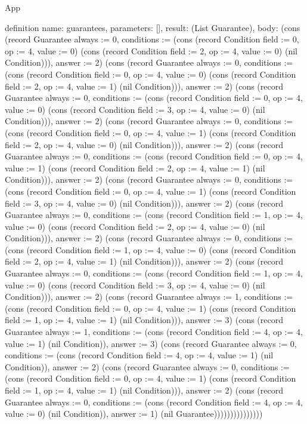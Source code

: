 \begin{lexlean}{App}
\begin{semanticmodule}
definition{
  name: guarantees,
  parameters: [],
  result: (List Guarantee),
  body: (cons (record Guarantee {always := 0, conditions := (cons (record Condition {field := 0, op := 4, value := 0}) (cons (record Condition {field := 2, op := 4, value := 0}) (nil Condition))), answer := 2}) (cons (record Guarantee {always := 0, conditions := (cons (record Condition {field := 0, op := 4, value := 0}) (cons (record Condition {field := 2, op := 4, value := 1}) (nil Condition))), answer := 2}) (cons (record Guarantee {always := 0, conditions := (cons (record Condition {field := 0, op := 4, value := 0}) (cons (record Condition {field := 3, op := 4, value := 0}) (nil Condition))), answer := 2}) (cons (record Guarantee {always := 0, conditions := (cons (record Condition {field := 0, op := 4, value := 1}) (cons (record Condition {field := 2, op := 4, value := 0}) (nil Condition))), answer := 2}) (cons (record Guarantee {always := 0, conditions := (cons (record Condition {field := 0, op := 4, value := 1}) (cons (record Condition {field := 2, op := 4, value := 1}) (nil Condition))), answer := 2}) (cons (record Guarantee {always := 0, conditions := (cons (record Condition {field := 0, op := 4, value := 1}) (cons (record Condition {field := 3, op := 4, value := 0}) (nil Condition))), answer := 2}) (cons (record Guarantee {always := 0, conditions := (cons (record Condition {field := 1, op := 4, value := 0}) (cons (record Condition {field := 2, op := 4, value := 0}) (nil Condition))), answer := 2}) (cons (record Guarantee {always := 0, conditions := (cons (record Condition {field := 1, op := 4, value := 0}) (cons (record Condition {field := 2, op := 4, value := 1}) (nil Condition))), answer := 2}) (cons (record Guarantee {always := 0, conditions := (cons (record Condition {field := 1, op := 4, value := 0}) (cons (record Condition {field := 3, op := 4, value := 0}) (nil Condition))), answer := 2}) (cons (record Guarantee {always := 1, conditions := (cons (record Condition {field := 0, op := 4, value := 1}) (cons (record Condition {field := 1, op := 4, value := 1}) (nil Condition))), answer := 3}) (cons (record Guarantee {always := 1, conditions := (cons (record Condition {field := 4, op := 4, value := 1}) (nil Condition)), answer := 3}) (cons (record Guarantee {always := 0, conditions := (cons (record Condition {field := 4, op := 4, value := 1}) (nil Condition)), answer := 2}) (cons (record Guarantee {always := 0, conditions := (cons (record Condition {field := 0, op := 4, value := 1}) (cons (record Condition {field := 1, op := 4, value := 1}) (nil Condition))), answer := 2}) (cons (record Guarantee {always := 0, conditions := (cons (record Condition {field := 4, op := 4, value := 0}) (nil Condition)), answer := 1}) (nil Guarantee)))))))))))))))
}


\end{semanticmodule}
\end{lexlean}

